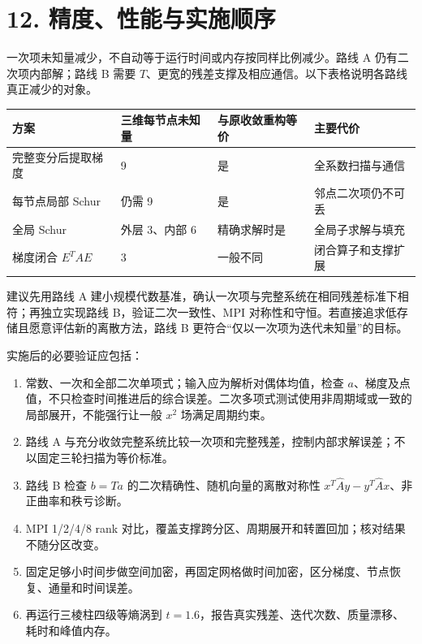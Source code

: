 \documentclass[
  11pt,
  a4paper,
]{article}
\providecommand{\tightlist}{%
  \setlength{\itemsep}{0pt}\setlength{\parskip}{0pt}}
\begin{document}
\hypertarget{ux7cbeux5ea6ux6027ux80fdux4e0eux5b9eux65bdux987aux5e8f}{%
\section{12.
精度、性能与实施顺序}\label{ux7cbeux5ea6ux6027ux80fdux4e0eux5b9eux65bdux987aux5e8f}}

一次项未知量减少，不自动等于运行时间或内存按同样比例减少。路线 A
仍有二次项内部解；路线 B 需要
\(T\)、更宽的残差支撑及相应通信。以下表格说明各路线真正减少的对象。

\begin{longtable}[]{@{}llll@{}}
\toprule\noalign{}
方案 & 三维每节点未知量 & 与原收敛重构等价 & 主要代价 \\
\midrule\noalign{}
\endhead
\bottomrule\noalign{}
\endlastfoot
完整变分后提取梯度 & 9 & 是 & 全系数扫描与通信 \\
每节点局部 Schur & 仍需 9 & 是 & 邻点二次项仍不可丢 \\
全局 Schur & 外层 3、内部 6 & 精确求解时是 & 全局子求解与填充 \\
梯度闭合 \(E^TAE\) & 3 & 一般不同 & 闭合算子和支撑扩展 \\
\end{longtable}

建议先用路线 A
建小规模代数基准，确认一次项与完整系统在相同残差标准下相符；再独立实现路线
B，验证二次一致性、MPI
对称性和守恒。若直接追求低存储且愿意评估新的离散方法，路线 B
更符合``仅以一次项为迭代未知量''的目标。

实施后的必要验证应包括：

\begin{enumerate}
\def\labelenumi{\arabic{enumi}.}
\tightlist
\item
  常数、一次和全部二次单项式；输入应为解析对偶体均值，检查
  \(a\)、梯度及点值，不只检查时间推进后的综合误差。二次多项式测试使用非周期域或一致的局部展开，不能强行让一般
  \(x^2\) 场满足周期约束。
\item
  路线 A
  与充分收敛完整系统比较一次项和完整残差，控制内部求解误差；不以固定三轮扫描为等价标准。
\item
  路线 B 检查 \(b=Ta\) 的二次精确性、随机向量的离散对称性
  \(x^T\widehat Ay-y^T\widehat Ax\)、非正曲率和秩亏诊断。
\item
  MPI 1/2/4/8 rank
  对比，覆盖支撑跨分区、周期展开和转置回加；核对结果不随分区改变。
\item
  固定足够小时间步做空间加密，再固定网格做时间加密，区分梯度、节点恢复、通量和时间误差。
\item
  再运行三棱柱四级等熵涡到
  \(t=1.6\)，报告真实残差、迭代次数、质量漂移、耗时和峰值内存。
\end{enumerate}
\end{document}
